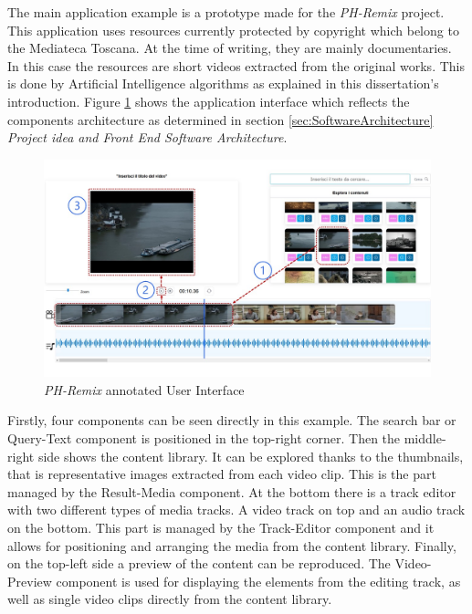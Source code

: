 The main application example is a prototype made for the \emph{PH-Remix} project. This application uses resources currently protected by copyright which belong to the Mediateca Toscana. At the time of writing, they are mainly documentaries. In this case the resources are short videos extracted from the original works. This is done by Artificial Intelligence algorithms as explained in this dissertation’s introduction. Figure \ref{fig:phRmxOverview} shows the application interface which reflects the components architecture as determined in section \ref{sec:SoftwareArchitecture} \emph{Project idea and Front End Software Architecture}.

\begin{figure}[H]
\centering
\includegraphics[width=1\textwidth]{images/PH-REmixannotatedUI.jpg}
\caption{\emph{PH-Remix} annotated User Interface}
\label{fig:phRmxOverview}
\end{figure}

Firstly, four components can be seen directly in this example. The search bar or Query-Text component is positioned in the top-right corner. Then the middle-right side shows the content library. It can be explored thanks to the thumbnails, that is representative images extracted from each video clip. This is the part managed by the Result-Media component. At the bottom there is a track editor with two different types of media tracks. A video track on top and an audio track on the bottom. This part is managed by the Track-Editor component and it allows for positioning and arranging the media from the content library. Finally, on the top-left side a preview of the content can be reproduced. The Video-Preview component is used for displaying the elements from the editing track, as well as single video clips directly from the content library.

